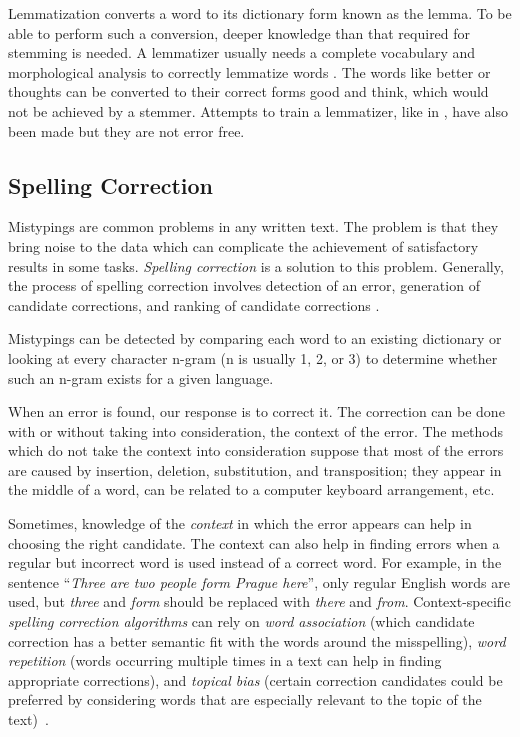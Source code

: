 Lemmatization converts a word to its dictionary form known as the lemma.
To be able to perform such a conversion, deeper knowledge than that required
for stemming is needed. A lemmatizer usually needs a complete vocabulary and
morphological analysis to correctly lemmatize words \cite{ref185}. The words like better or thoughts can be converted to their correct forms good and think, which
would not be achieved by a stemmer. Attempts to train a lemmatizer, like in
\cite{ref14,ref136}, have also been made but they are not error free.

\subsection{Spelling Correction}

Mistypings are common problems in any written text. The problem is that they
bring noise to the data which can complicate the achievement of satisfactory
results in some tasks. \textit{Spelling correction} is a solution to this problem. Generally,
the process of spelling correction involves detection of an error, generation of
candidate corrections, and ranking of candidate corrections \cite{ref155}.

Mistypings can be detected by comparing each word to an existing dictionary
or looking at every character n-gram (n is usually 1, 2, or 3) to determine whether
such an n-gram exists for a given language.

When an error is found, our response is to correct it. The correction can be
done with or without taking into consideration, the context of the error. The methods which do not take the context into consideration suppose that most of the errors are caused by insertion, deletion, substitution, and transposition; they appear
in the middle of a word, can be related to a computer keyboard arrangement, etc.

Sometimes, knowledge of the \textit{context} in which the error appears can help in
choosing the right candidate. The context can also help in finding errors when
a regular but incorrect word is used instead of a correct word. For example, in
the sentence ``\textit{Three are two people form Prague here}'', only regular English 
words are used, but \textit{three} and \textit{form} should be replaced with 
\textit{there} and \textit{from}. Context-specific \textit{spelling correction algorithms} 
can rely on \textit{word association} (which candidate correction has a better semantic 
fit with the words around the misspelling), \textit{word repetition} (words occurring 
multiple times in a text can help in finding appropriate corrections), and 
\textit{topical bias} (certain correction candidates could be preferred by considering 
words that are especially relevant to the topic of the text)~\cite{ref90}.

